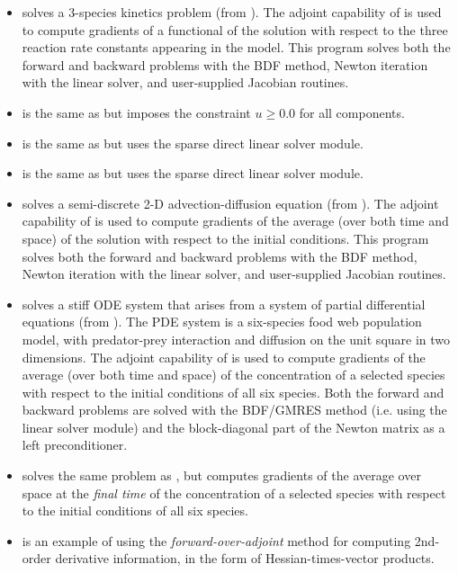 \begin{itemize}
\item {}
  solves a 3-species kinetics problem (from ).
  \newline
  The adjoint capability of {\cvodes} is used to compute gradients
  of a functional of the solution with respect to the three
  reaction rate constants appearing in the model.
  This program solves both the forward and backward problems with the BDF method, 
  Newton iteration with the {\sunlinsoldense} linear solver, and user-supplied
  Jacobian routines.
\item {}
  is the same as  but imposes the constraint
  $u \geq 0.0$ for all components.
\item {}
  is the same as  but uses the
  {\sunlinsolklu} sparse direct linear solver module.
\item {}
  is the same as  but uses the
  {\sunlinsolslumt} sparse direct linear solver module.
\item {}
  solves a semi-discrete 2-D advection-diffusion equation (from ).
  \newline
  The adjoint capability of {\cvodes} is used to compute gradients
  of the average (over both time and space) of the solution with respect to
  the initial conditions.
  This program solves both the forward and backward problems with the BDF method, 
  Newton iteration with the {\sunlinsolband} linear solver, and user-supplied     
  Jacobian routines.
\item {}
  solves a stiff ODE system that arises from a system of partial differential
  equations (from ).  The PDE system is a six-species
  food web population model, with predator-prey interaction and diffusion 
  on the unit square in two dimensions.
  \newline
  The adjoint capability of {\cvodes} is used to compute gradients of the
  average (over both time and space) of the concentration of a selected species
  with respect to the initial conditions of all six species.
  Both the forward and backward problems are solved with the BDF/GMRES method 
  (i.e. using the {\sunlinsolspgmr} linear solver module) and the block-diagonal part of the  
  Newton matrix as a left preconditioner.
\item {}
  solves the same problem as , but computes gradients of the
  average over space at the {\em final time} of the concentration of a selected species
  with respect to the initial conditions of all six species.


\item {}
  is an example of using the {\em forward-over-adjoint} method for
  computing 2nd-order derivative information, in the form of Hessian-times-vector
  products.

\end{itemize}

